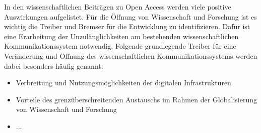 In den wissenschaftlichen Beiträgen zu Open Access werden viele positive Auswirkungen aufgelistet. Für die Öffnung von Wissenschaft und Forschung ist es wichtig die Treiber und Bremser für die Entwicklung zu identifizieren. Dafür ist eine Erarbeitung der Unzulänglichkeiten am bestehenden wissenschaftlichen Kommunikationssystem notwendig\cite{cite:17}. Folgende grundlegende Treiber für eine Veränderung und Öffnung des wissenschaftlichen Kommunikationssystems werden dabei besonders häufig genannt:

\begin{itemize}
\item Verbreitung und Nutzungsmöglichkeiten der digitalen Infrastrukturen
\item Vorteile des grenzüberschreitenden Austauschs im Rahmen der Globalisierung von Wissenschaft und Forschung
\item ...
\end{itemize}

